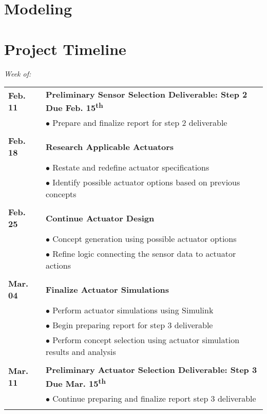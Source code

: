 \documentclass[12pt]{article}
\newcommand{\ts}{\textsuperscript}
\begin{document}
\section{Modeling}

\clearpage
\section{Project Timeline}

\begin{flushleft}
\textit{Week of:}

\begin{tabular}{l | l}


 
\textbf{Feb. 11} &\textbf{Preliminary Sensor Selection Deliverable: Step 2 Due Feb. 15\ts{th}}\\
 & $\bullet$ Prepare and finalize report for step 2 deliverable\\\\
 
\textbf{Feb. 18} &\textbf{Research Applicable Actuators}\\
 & $\bullet$ Restate and redefine actuator specifications\\
  & $\bullet$ Identify possible actuator options based on previous concepts\\\\
  
\textbf{Feb. 25} & \textbf{Continue Actuator Design}\\
 & $\bullet$ Concept generation using possible actuator options\\
  & $\bullet$ Refine logic connecting the sensor data to actuator actions\\\\
  
\textbf{Mar. 04} & \textbf{Finalize Actuator Simulations}\\
 & $\bullet$ Perform actuator simulations using Simulink\\
 & $\bullet$ Begin preparing report for step 3 deliverable\\
 & $\bullet$ Perform concept selection using actuator simulation results and analysis\\\\
 
\textbf{Mar. 11} &\textbf{Preliminary Actuator Selection Deliverable: Step 3 Due Mar. 15\ts{th}}\\
 & $\bullet$ Continue preparing and finalize report step 3 deliverable\\\\
 

\end{tabular}
\end{flushleft}
\end{document}
